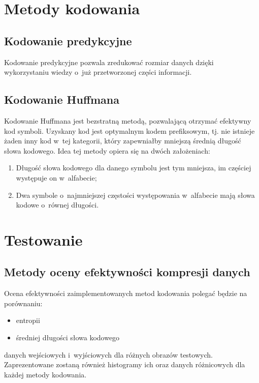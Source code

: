 \section{Metody kodowania}
\label{sec:metody}

\subsection{Kodowanie predykcyjne}
\label{subsec:kodowanie_roznicowe}

Kodowanie predykcyjne pozwala zredukować rozmiar danych dzięki wykorzystaniu wiedzy o~już przetworzonej części informacji. 

\subsection{Kodowanie  Huffmana}
\label{subsec:kod_huffamana}

Kodowanie Huffmana jest bezstratną metodą, pozwalającą otrzymać efektywny kod symboli. Uzyskany kod jest optymalnym kodem prefiksowym, tj. nie istnieje żaden inny kod w~tej kategorii, który zapewniałby mniejszą średnią długość słowa kodowego. Idea tej metody opiera się na dwóch założeniach:

\begin{enumerate} \itemsep1pt
	\item Długość słowa kodowego dla danego symbolu jest tym mniejsza, im częściej występuje on w~alfabecie;
	\item Dwa symbole o~najmniejszej częstości występowania w~alfabecie mają słowa kodowe o~równej długości.
\end{enumerate}

\section{Testowanie}
\label{sec:testowanie}

\subsection{Metody oceny efektywności kompresji danych}
\label{subsec:metody_oceny_efektywnosci_kompresji_danych}
Ocena efektywności zaimplementowanych metod kodowania polegać będzie na porównaniu:
\begin{itemize} \itemsep1pt
	\item entropii
	\item średniej długości słowa kodowego
\end{itemize}
danych wejściowych i~wyjściowych dla różnych obrazów testowych. Zaprezentowane zostaną również histogramy ich oraz danych różnicowych dla każdej metody kodowania.

